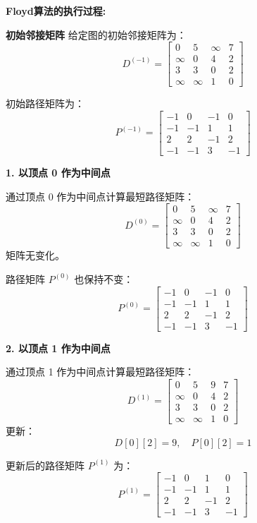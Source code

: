 \documentclass[lang=cn,newtx,10pt,scheme=chinese]{elegantbook}
\begin{document}
\textbf{Floyd算法的执行过程:}
 



\textbf{初始邻接矩阵}
给定图的初始邻接矩阵为：
\[
D^{(-1)} =
\begin{bmatrix}
0 & 5 & \infty & 7 \\
\infty & 0 & 4 & 2 \\
3 & 3 & 0 & 2 \\
\infty & \infty & 1 & 0
\end{bmatrix}
\]

初始路径矩阵为：
\[
P^{(-1)} =
\begin{bmatrix}
-1 & 0 & -1 & 0 \\
-1 & -1 & 1 & 1 \\
2 & 2 & -1 & 2 \\
-1 & -1 & 3 & -1
\end{bmatrix}
\]


\textbf{1. 以顶点 0 作为中间点}

通过顶点 0 作为中间点计算最短路径矩阵：
\[
D^{(0)} =
\begin{bmatrix}
0 & 5 & \infty & 7 \\
\infty & 0 & 4 & 2 \\
3 & 3 & 0 & 2 \\
\infty & \infty & 1 & 0
\end{bmatrix}
\]
矩阵无变化。

路径矩阵 \( P^{(0)} \) 也保持不变：
\[
P^{(0)} =
\begin{bmatrix}
-1 & 0 & -1 & 0 \\
-1 & -1 & 1 & 1 \\
2 & 2 & -1 & 2 \\
-1 & -1 & 3 & -1
\end{bmatrix}
\]

\textbf{2. 以顶点 1 作为中间点}

通过顶点 1 作为中间点计算最短路径矩阵：
\[
D^{(1)} =
\begin{bmatrix}
0 & 5 & 9 & 7 \\
\infty & 0 & 4 & 2 \\
3 & 3 & 0 & 2 \\
\infty & \infty & 1 & 0
\end{bmatrix}
\]
更新：
\[
D[0][2] = 9, \quad P[0][2] = 1
\]

更新后的路径矩阵 \( P^{(1)} \) 为：
\[
P^{(1)} =
\begin{bmatrix}
-1 & 0 & 1 & 0 \\
-1 & -1 & 1 & 1 \\
2 & 2 & -1 & 2 \\
-1 & -1 & 3 & -1
\end{bmatrix}
\]
\end{document}
